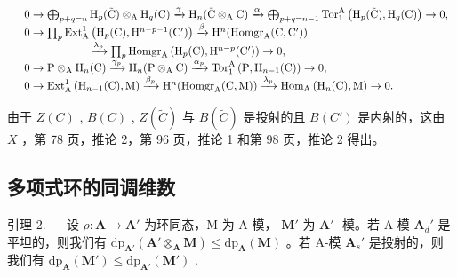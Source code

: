 \[
\begin{array}{r l} & 0 \to \bigoplus_ {p + q = n} \mathrm{H} _ {p} (\tilde {\mathrm{C}}) \otimes_ {\mathrm{A}} \mathrm{H} _ {q} (\mathrm{C}) \xrightarrow {\gamma} \mathrm{H} _ {n} (\tilde {\mathrm{C}} \otimes_ {\mathrm{A}} \mathrm{C}) \xrightarrow {\alpha} \bigoplus_ {p + q = n - 1} \mathrm{Tor} _ {1} ^ {\mathrm{A}} \left(\mathrm{H} _ {p} (\tilde {\mathrm{C}}), \mathrm{H} _ {q} (\mathrm{C})\right) \to 0, \\ & 0 \to \prod_ {p} \mathrm{Ext} _ {\mathrm{A}} ^ {1} \left(\mathrm{H} _ {p} (\mathrm{C}), \mathrm{H} ^ {n - p - 1} (\mathrm{C} ^ {\prime})\right) \xrightarrow {\beta} \mathrm{H} ^ {n} (\mathrm{Homgr} _ {\mathrm{A}} (\mathrm{C}, \mathrm{C} ^ {\prime})) \\ & \qquad \qquad \qquad \xrightarrow {\lambda_ {p}} \prod_ {p} \mathrm{Homgr} _ {\mathrm{A}} \left(\mathrm{H} _ {p} (\mathrm{C}), \mathrm{H} ^ {n - p} (\mathrm{C} ^ {\prime})\right) \to 0, \\ & 0 \to \mathrm{P} \otimes_ {\mathrm{A}} \mathrm{H} _ {n} (\mathrm{C}) \xrightarrow {\gamma_ {p}} \mathrm{H} _ {n} (\mathrm{P} \otimes_ {\mathrm{A}} \mathrm{C}) \xrightarrow {\alpha_ {p}} \mathrm{Tor} _ {1} ^ {\mathrm{A}} \left(\mathrm{P}, \mathrm{H} _ {n - 1} (\mathrm{C})\right) \to 0, \\ & 0 \to \mathrm{Ext} _ {\mathrm{A}} ^ {1} \left(\mathrm{H} _ {n - 1} (\mathrm{C}), \mathrm{M}\right) \xrightarrow {\beta_ {p}} \mathrm{H} ^ {n} (\mathrm{Homgr} _ {\mathrm{A}} (\mathrm{C}, \mathrm{M})) \xrightarrow {\lambda_ {p}} \mathrm{Hom} _ {\mathrm{A}} \left(\mathrm{H} _ {n} (\mathrm{C}), \mathrm{M}\right) \to 0. \end{array}
\]

由于 \(Z(C)\) , \(B(C)\) , \(Z(\tilde{C})\) 与 \(B(\tilde{C})\) 是投射的且 \(B(C')\) 是内射的，这由 \(X\) ，第 78 页，推论 2，第 96 页，推论 1 和第 98 页，推论 2 得出。

\subsection{多项式环的同调维数}

引理 2. --- 设 \(\rho: \mathbf{A} \to \mathbf{A}'\) 为环同态，M 为 A-模， \(\mathbf{M}'\) 为 \(\mathbf{A}'\) -模。若 A-模 \(\mathbf{A}_d'\) 是平坦的，则我们有 \(\mathrm{dp}_{\mathbf{A}'}(\mathbf{A}' \otimes_{\mathbf{A}} \mathbf{M}) \leqslant \mathrm{dp}_{\mathbf{A}}(\mathbf{M})\) 。若 A-模 \(\mathbf{A}_s'\) 是投射的，则我们有 \(\mathrm{dp}_{\mathbf{A}}(\mathbf{M}') \leqslant \mathrm{dp}_{\mathbf{A}'}(\mathbf{M}')\) .

